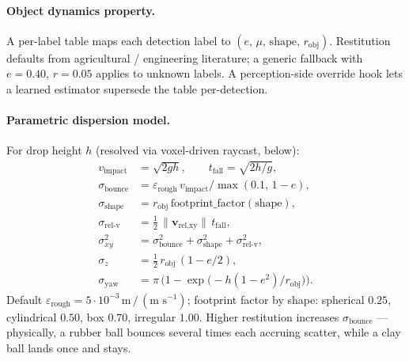 \documentclass[11pt]{article}
\begin{document}
\paragraph{Object dynamics property.}
A per-label table maps each detection label to
$(e,\,\mu,\,\text{shape},\,r_{\text{obj}})$. Restitution defaults from
agricultural / engineering literature; a generic fallback with
$e=0.40,\,r=0.05$ applies to unknown labels. A perception-side override
hook lets a learned estimator supersede the table per-detection.

\paragraph{Parametric dispersion model.}
For drop height $h$ (resolved via voxel-driven raycast, below):
\begin{equation}\label{eq:gravity_sigma}
\begin{aligned}
v_{\text{impact}} &= \sqrt{2 g h}, \qquad
  t_{\text{fall}}  = \sqrt{2 h / g}, \\
\sigma_{\text{bounce}} &= \varepsilon_{\text{rough}}\,v_{\text{impact}} \big/ \max(0.1,\,1-e), \\
\sigma_{\text{shape}}  &= r_{\text{obj}}\,\text{footprint\_factor}(\text{shape}), \\
\sigma_{\text{rel-v}}  &= \tfrac{1}{2}\,\|\bm v_{\text{rel,xy}}\|\,t_{\text{fall}}, \\
\sigma_{xy}^2 &= \sigma_{\text{bounce}}^2 + \sigma_{\text{shape}}^2 + \sigma_{\text{rel-v}}^2, \\
\sigma_{z} &= \tfrac{1}{2}\,r_{\text{obj}}\,(1 - e/2), \\
\sigma_{\text{yaw}} &= \pi\,\bigl(1 - \exp\!\bigl(-h(1-e^2)/r_{\text{obj}}\bigr)\bigr).
\end{aligned}
\end{equation}
Default $\varepsilon_{\text{rough}} = 5\!\cdot\!10^{-3}\,\text{m}\,/\,(\text{m s}^{-1})$;
footprint factor by shape: spherical $0.25$, cylindrical $0.50$, box $0.70$,
irregular $1.00$. Higher restitution increases $\sigma_{\text{bounce}}$ ---
physically, a rubber ball bounces several times each accruing scatter,
while a clay ball lands once and stays.
\end{document}
